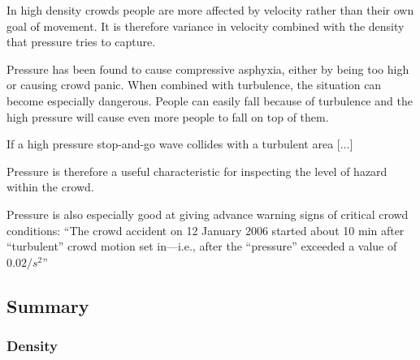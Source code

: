 In high density crowds people are more affected by velocity rather than their own goal of movement. It is therefore variance in velocity combined with the density that pressure tries to capture.

Pressure has been found to cause compressive asphyxia, either by being too high or causing crowd panic. When combined with turbulence, the situation can become especially dangerous. People can easily fall because of turbulence and the high pressure will cause even more people to fall on top of them.

If a high pressure stop-and-go wave collides with a turbulent area [...]

Pressure is therefore a useful characteristic for inspecting the level of hazard within the crowd.

Pressure is also especially good at giving advance warning signs of critical crowd conditions: \enquote{The crowd accident on 12 January 2006 started about 10 min after “turbulent” crowd motion set in—i.e., after the “pressure” exceeded a value of $0.02/s^2$}

\subsection{Summary}\label{sec:crowd_conditions_summary}


\subsubsection{Density}


